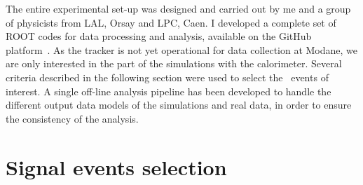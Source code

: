 
The entire experimental set-up was designed and carried out by me and a group of physicists from LAL, Orsay and LPC, Caen.
I developed a complete set of ROOT codes for data processing and analysis, available on the GitHub platform~\cite{myGit}.
As the tracker is not yet operational for data collection at Modane, we are only interested in the part of the simulations with the calorimeter.
Several criteria described in the following section were used to select the \Co\ events of interest.
A single off-line analysis pipeline has been developed to handle the different output data models of the simulations and real data, in order to ensure the consistency of the analysis.

\section{Signal events selection}
\label{subsec:Co_datacut}

